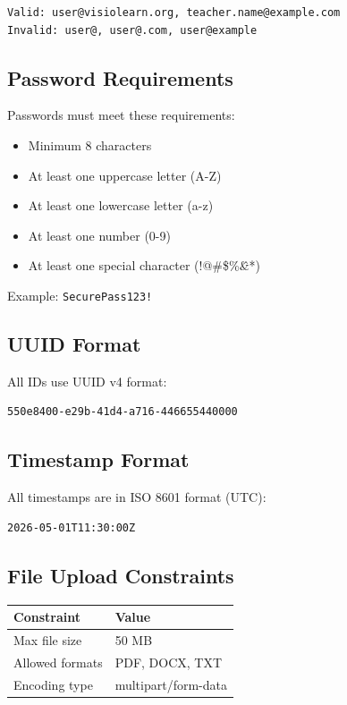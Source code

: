 \documentclass[12pt,a4paper,oneside]{article}
\begin{document}
\begin{lstlisting}
Valid: user@visiolearn.org, teacher.name@example.com
Invalid: user@, user@.com, user@example
\end{lstlisting}

\subsection{Password Requirements}

Passwords must meet these requirements:

\begin{itemize}
    \item Minimum 8 characters
    \item At least one uppercase letter (A-Z)
    \item At least one lowercase letter (a-z)
    \item At least one number (0-9)
    \item At least one special character (!@\#\$\%\^\&*)
\end{itemize}

Example: \texttt{SecurePass123!}

\subsection{UUID Format}

All IDs use UUID v4 format:

\begin{lstlisting}
550e8400-e29b-41d4-a716-446655440000
\end{lstlisting}

\subsection{Timestamp Format}

All timestamps are in ISO 8601 format (UTC):

\begin{lstlisting}
2026-05-01T11:30:00Z
\end{lstlisting}

\subsection{File Upload Constraints}

\begin{table}[H]
\centering
\small
\begin{tabular}{|l|l|}
\hline
\textbf{Constraint} & \textbf{Value} \\
\hline
Max file size & 50 MB \\
\hline
Allowed formats & PDF, DOCX, TXT \\
\hline
Encoding type & multipart/form-data \\
\hline
\end{tabular}
\end{table}
\end{document}
